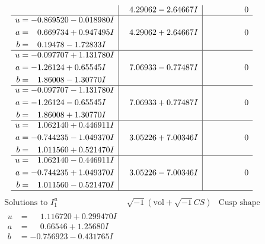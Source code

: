 \documentclass[1p]{elsarticle_modified}
\theoremstyle{definition}
\newcommand{\I}{\sqrt{-1}}
\begin{document}
$$\begin{array}{c|c|c}
 & \phantom{-}4.29062 - 2.64667 I & \phantom{-0.000000 } 0 \\ \hline\begin{aligned}
u &= -0.869520 - 0.018980 I \\
a &= \phantom{-}0.669734 + 0.947495 I \\
b &= \phantom{-}0.19478 - 1.72833 I\end{aligned}
 & \phantom{-}4.29062 + 2.64667 I & \phantom{-0.000000 } 0 \\ \hline\begin{aligned}
u &= -0.097707 + 1.131780 I \\
a &= -1.26124 + 0.65545 I \\
b &= \phantom{-}1.86008 - 1.30770 I\end{aligned}
 & \phantom{-}7.06933 - 0.77487 I & \phantom{-0.000000 } 0 \\ \hline\begin{aligned}
u &= -0.097707 - 1.131780 I \\
a &= -1.26124 - 0.65545 I \\
b &= \phantom{-}1.86008 + 1.30770 I\end{aligned}
 & \phantom{-}7.06933 + 0.77487 I & \phantom{-0.000000 } 0 \\ \hline\begin{aligned}
u &= \phantom{-}1.062140 + 0.446911 I \\
a &= -0.744235 - 1.049370 I \\
b &= \phantom{-}1.011560 + 0.521470 I\end{aligned}
 & \phantom{-}3.05226 + 7.00346 I & \phantom{-0.000000 } 0 \\ \hline\begin{aligned}
u &= \phantom{-}1.062140 - 0.446911 I \\
a &= -0.744235 + 1.049370 I \\
b &= \phantom{-}1.011560 - 0.521470 I\end{aligned}
 & \phantom{-}3.05226 - 7.00346 I & \phantom{-0.000000 } 0\\
 \hline 
 \end{array}$$\newpage$$\begin{array}{c|c|c}  
\text{Solutions to }I^u_{1}& \I (\text{vol} + \sqrt{-1}CS) & \text{Cusp shape}\\
 \hline 
\begin{aligned}
u &= \phantom{-}1.116720 + 0.299470 I \\
a &= \phantom{-}0.66546 + 1.25680 I \\
b &= -0.756923 - 0.431765 I\end{aligned}

\end{array}$$
\end{document}

